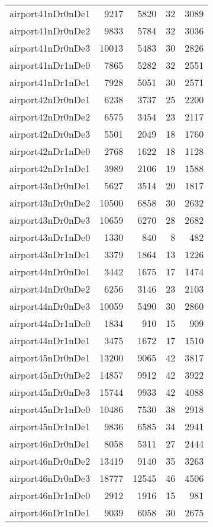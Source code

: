 \begin{longtable}{lrrrr}
airport41nDr0nDe1 & 9217 & 5820 & 32 & 3089 \\
airport41nDr0nDe2 & 9833 & 5784 & 32 & 3036 \\
airport41nDr0nDe3 & 10013 & 5483 & 30 & 2826 \\
airport41nDr1nDe0 & 7865 & 5282 & 32 & 2551 \\
airport41nDr1nDe1 & 7928 & 5051 & 30 & 2571 \\
airport42nDr0nDe1 & 6238 & 3737 & 25 & 2200 \\
airport42nDr0nDe2 & 6575 & 3454 & 23 & 2117 \\
airport42nDr0nDe3 & 5501 & 2049 & 18 & 1760 \\
airport42nDr1nDe0 & 2768 & 1622 & 18 & 1128 \\
airport42nDr1nDe1 & 3989 & 2106 & 19 & 1588 \\
airport43nDr0nDe1 & 5627 & 3514 & 20 & 1817 \\
airport43nDr0nDe2 & 10500 & 6858 & 30 & 2632 \\
airport43nDr0nDe3 & 10659 & 6270 & 28 & 2682 \\
airport43nDr1nDe0 & 1330 & 840 & 8 & 482 \\
airport43nDr1nDe1 & 3379 & 1864 & 13 & 1226 \\
airport44nDr0nDe1 & 3442 & 1675 & 17 & 1474 \\
airport44nDr0nDe2 & 6256 & 3146 & 23 & 2103 \\
airport44nDr0nDe3 & 10059 & 5490 & 30 & 2860 \\
airport44nDr1nDe0 & 1834 & 910 & 15 & 909 \\
airport44nDr1nDe1 & 3475 & 1672 & 17 & 1510 \\
airport45nDr0nDe1 & 13200 & 9065 & 42 & 3817 \\
airport45nDr0nDe2 & 14857 & 9912 & 42 & 3922 \\
airport45nDr0nDe3 & 15744 & 9933 & 42 & 4088 \\
airport45nDr1nDe0 & 10486 & 7530 & 38 & 2918 \\
airport45nDr1nDe1 & 9836 & 6585 & 34 & 2941 \\
airport46nDr0nDe1 & 8058 & 5311 & 27 & 2444 \\
airport46nDr0nDe2 & 13419 & 9140 & 35 & 3263 \\
airport46nDr0nDe3 & 18777 & 12545 & 46 & 4506 \\
airport46nDr1nDe0 & 2912 & 1916 & 15 & 981 \\
airport46nDr1nDe1 & 9039 & 6058 & 30 & 2675 \\

\end{longtable}

